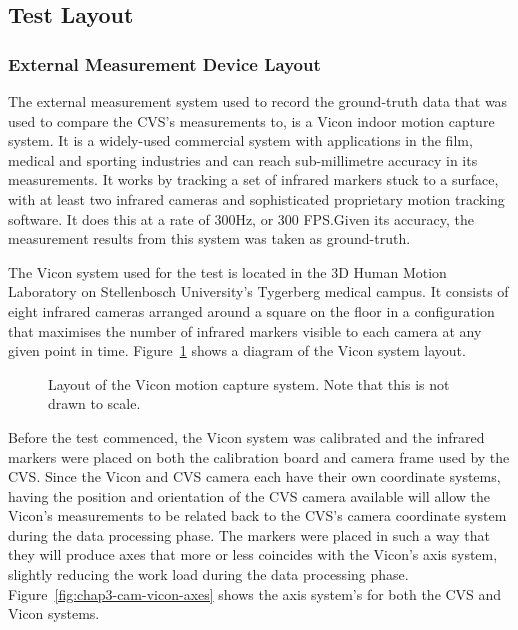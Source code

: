 \subsection{Test Layout}
\label{sec:vicon-test-setup}

\subsubsection{External Measurement Device Layout}

The external measurement system used to record the ground-truth data that was used to compare the CVS's measurements to, is a Vicon indoor motion capture system. It is a widely-used commercial system with applications in the film, medical and sporting industries and can reach sub-millimetre accuracy in its measurements. It works by tracking a set of infrared markers stuck to a surface, with at least two infrared cameras and sophisticated proprietary motion tracking software. It does this at a rate of 300Hz, or 300 FPS.\@ Given its accuracy, the measurement results from this system was taken as ground-truth.

The Vicon system used for the test is located in the 3D Human Motion Laboratory on Stellenbosch University's Tygerberg medical campus. It consists of eight infrared cameras arranged around a square on the floor in a configuration that maximises the number of infrared markers visible to each camera at any given point in time. Figure~\ref{fig:chap3-vicon-layout} shows a diagram of the Vicon system layout. 
 
\begin{figure}
  \centering
  \def\svgwidth{0.5\textwidth}
  
  \caption[Layout of the Vicon motion capture system.]{Layout of the Vicon motion capture system. Note that this is not drawn to scale.}
\label{fig:chap3-vicon-layout}
\end{figure}

Before the test commenced, the Vicon system was calibrated and the infrared markers were placed on both the calibration board and camera frame used by the CVS\@. Since the Vicon and CVS camera each have their own coordinate systems, having the position and orientation of the CVS camera available will allow the Vicon's measurements to be related back to the CVS's camera coordinate system during the data processing phase. The markers were placed in such a way that they will produce axes that more or less coincides with the Vicon's axis system, slightly reducing the work load during the data processing phase. Figure~\ref{fig:chap3-cam-vicon-axes} shows the axis system's for both the CVS and Vicon systems.

